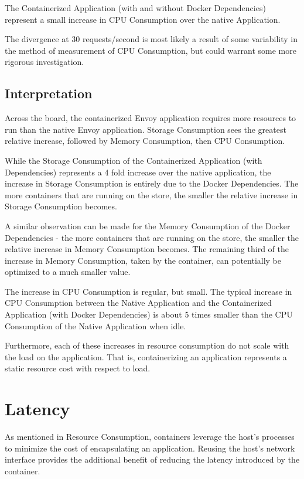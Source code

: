 \documentclass{article}
\begin{document}
The Containerized Application (with and without Docker Dependencies) represent a small increase in CPU Consumption over the native Application.

The divergence at 30 requests/second is most likely a result of some variability in the method of measurement of CPU Consumption, but could warrant some more rigorous investigation.

\subsection{Interpretation}
Across the board, the containerized Envoy application requires more resources to run than the native Envoy application. Storage Consumption sees the greatest relative increase, followed by Memory Consumption, then CPU Consumption.

While the Storage Consumption of the Containerized Application (with Dependencies) represents a 4 fold increase over the native application, the increase in Storage Consumption is entirely due to the Docker Dependencies. The more containers that are running on the store, the smaller the relative increase in Storage Consumption becomes.

A similar observation can be made for the Memory Consumption of the Docker Dependencies - the more containers that are running on the store, the smaller the relative increase in Memory Consumption becomes. The remaining third of the increase in Memory Consumption, taken by the container, can potentially be optimized to a much smaller value.

The increase in CPU Consumption is regular, but small. The typical increase in CPU Consumption between the Native Application and the Containerized Application (with Docker Dependencies) is about 5 times smaller than the CPU Consumption of the Native Application when idle.

Furthermore, each of these increases in resource consumption do not scale with the load on the application. That is, containerizing an application represents a static resource cost with respect to load.

\section{Latency}
As mentioned in Resource Consumption, containers leverage the host's processes to minimize the cost of encapsulating an application. Reusing the host's network interface provides the additional benefit of reducing the latency introduced by the container.
\end{document}
